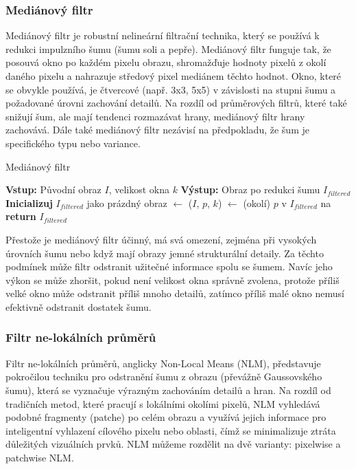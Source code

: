 \documentclass[male,czech,api_ing]{thesis}
\begin{document}
\subsubsection{Mediánový filtr}
Mediánový filtr je robustní nelineární filtrační technika, který se používá k redukci impulzního šumu (šumu soli a pepře). Mediánový filtr funguje tak, že posouvá okno po každém pixelu obrazu, shromažďuje hodnoty pixelů z okolí daného pixelu a nahrazuje středový pixel mediánem těchto hodnot. Okno, které se obvykle používá, je čtvercové (např. 3x3, 5x5) v závislosti na stupni šumu a požadované úrovni zachování detailů. Na rozdíl od průměrových filtrů, které také snižují šum, ale mají tendenci rozmazávat hrany, mediánový filtr hrany zachovává. Dále také mediánový filtr nezávisí na předpokladu, že šum je specifického typu nebo variance.

\begin{algorithm}
    \caption{Mediánový filtr}
    \begin{algorithmic}[1]
        \State \textbf{Vstup:} Původní obraz $I$, velikost okna $k$
        \State \textbf{Výstup:} Obraz po redukci šumu $I_{filtered}$
        \State \textbf{Inicializuj} $I_{filtered}$ jako prázdný obraz
            \State {} $\gets$ ($I$, $p$, $k$)
            \State {} $\gets$ (okolí)
            \State {} $p$ v $I_{filtered}$ na 
        \EndFor
        \State \textbf{return} $I_{filtered}$
    \end{algorithmic}
\end{algorithm}

Přestože je mediánový filtr účinný, má svá omezení, zejména při vysokých úrovních šumu nebo když mají obrazy jemné strukturální detaily. Za těchto podmínek může filtr odstranit užitečné informace spolu se šumem. Navíc jeho výkon se může zhoršit, pokud není velikost okna správně zvolena, protože příliš velké okno může odstranit příliš mnoho detailů, zatímco příliš malé okno nemusí efektivně odstranit dostatek šumu.

\subsubsection{Filtr ne-lokálních průměrů}
Filtr ne-lokálních průměrů, anglicky Non-Local Means (NLM), představuje pokročilou techniku pro odstranění šumu z obrazu (převážně Gaussovského šumu), která se vyznačuje výrazným zachováním detailů a hran. Na rozdíl od tradičních metod, které pracují s lokálními okolími pixelů, NLM vyhledává podobné fragmenty (patche) po celém obrazu a využívá jejich informace pro inteligentní vyhlazení cílového pixelu nebo oblasti, čímž se minimalizuje ztráta důležitých vizuálních prvků. NLM můžeme rozdělit na dvě varianty: pixelwise a patchwise NLM.
\end{document}

